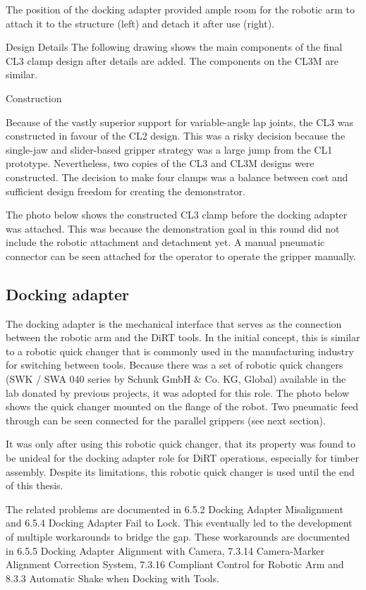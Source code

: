 The position of the docking adapter provided ample room for the robotic arm to attach it to the structure (left) and detach it after use (right). 

Design Details
The following drawing shows the main components of the final CL3 clamp design after details are added. The components on the CL3M are similar.


Construction

Because of the vastly superior support for variable-angle lap joints, the CL3 was constructed in favour of the CL2 design. This was a risky decision because the single-jaw and slider-based gripper strategy was a large jump from the CL1 prototype. Nevertheless, two copies of the CL3 and CL3M designs were constructed. The decision to make four clamps was a balance between cost and sufficient design freedom for creating the demonstrator.

The photo below shows the constructed CL3 clamp before the docking adapter was attached. This was because the demonstration goal in this round did not include the robotic attachment and detachment yet. A manual pneumatic connector can be seen attached for the operator to operate the gripper manually.

\subsection{Docking adapter}
The docking adapter is the mechanical interface that serves as the connection between the robotic arm and the DiRT tools. In the initial concept, this is similar to a robotic quick changer that is commonly used in the manufacturing industry for switching between tools. Because there was a set of robotic quick changers (SWK / SWA 040 series by Schunk GmbH \& Co. KG, Global) available in the lab donated by previous projects, it was adopted for this role. The photo below shows the quick changer mounted on the flange of the robot. Two pneumatic feed through can be seen connected for the parallel grippers (see next section).

It was only after using this robotic quick changer, that its property was found to be unideal for the docking adapter role for DiRT operations, especially for timber assembly. Despite its limitations, this robotic quick changer is used until the end of this thesis.

The related problems are documented in 6.5.2 Docking Adapter Misalignment and 6.5.4 Docking Adapter Fail to Lock. This eventually led to the development of multiple workarounds to bridge the gap. These workarounds are documented in 6.5.5 Docking Adapter Alignment with Camera, 7.3.14 Camera-Marker Alignment Correction System, 7.3.16 Compliant Control for Robotic Arm and 8.3.3 Automatic Shake when Docking with Tools. 

